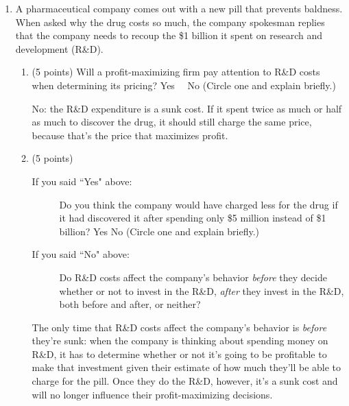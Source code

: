 \documentclass[twoside]{article}
\newcommand{\mybigskip}{\vspace{1in}}
\begin{document}
\begin{enumerate}


\item \begin{EXAM} A pharmaceutical company comes out with a new pill that prevents baldness. When asked why the drug
costs so much, the company spokesman replies that the company needs to recoup the \$1 billion it spent on research and
development (R\&D). \end{EXAM}

    \begin{enumerate}

    \item \begin{EXAM} (5 points) Will a profit-maximizing firm pay attention to R\&D costs when determining its pricing?
    Yes \ \   No  (Circle one and explain briefly.)     \mybigskip \end{EXAM}

\begin{KEY}
No: the R\&D expenditure is a sunk cost. If it spent twice as much or half as much to discover the drug, it should still
charge the same price, because that's the price that maximizes profit.
\end{KEY}

    \item \begin{EXAM} (5 points)
        \begin{description}
        \item [If you said ``Yes" above:] Do you think the company would have charged less for the drug if it had
        discovered it after spending only \$5 million instead of \$1 billion? Yes  No  (Circle one and explain briefly.)
        \item [If you said ``No" above:] Do R\&D costs affect the company's behavior \emph{before} they decide whether or
        not to invest in the R\&D, \emph{after} they invest in the R\&D, both before and after, or neither?
         \end{description}
    \vspace{1in} \end{EXAM}

\begin{KEY}
The only time that R\&D costs affect the company's behavior is \emph{before} they're sunk: when the company is thinking
about spending money on R\&D, it has to determine whether or not it's going to be profitable to make that investment
given their estimate of how much they'll be able to charge for the pill. Once they do the R\&D, however, it's a sunk cost
and will no longer influence their profit-maximizing decisions.
\end{KEY}


\end{enumerate}
\end{enumerate}
\end{document}
